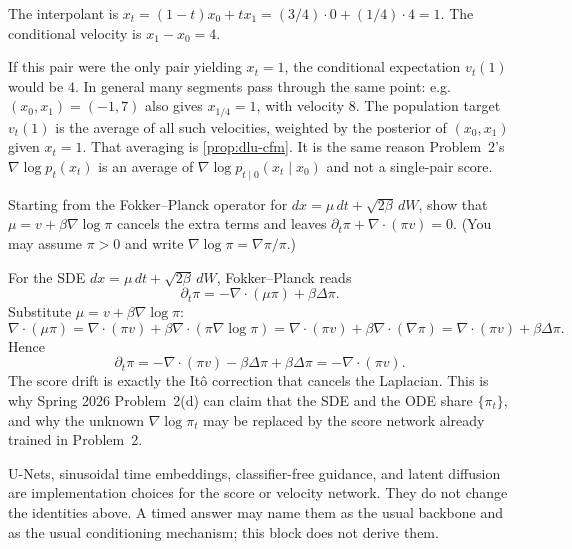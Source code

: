 \begin{solution}
The interpolant is \(x_t=(1-t)x_0+tx_1=(3/4)\cdot 0+(1/4)\cdot 4=1\). The conditional velocity is \(x_1-x_0=4\).

If this pair were the only pair yielding \(x_t=1\), the conditional expectation \(v_t(1)\) would be \(4\). In general many segments pass through the same point: e.g.\ \((x_0,x_1)=(-1,7)\) also gives \(x_{1/4}=1\), with velocity \(8\). The population target \(v_t(1)\) is the average of all such velocities, weighted by the posterior of \((x_0,x_1)\) given \(x_t=1\). That averaging is \cref{prop:dlu-cfm}. It is the same reason Problem~2's \(\nabla\log p_t(x_t)\) is an average of \(\nabla\log p_{t\mid 0}(x_t\mid x_0)\) and not a single-pair score.
\end{solution}

\begin{exercise}
\label{ex:dlu-fp}
Starting from the Fokker--Planck operator for \(dx=\mu\,dt+\sqrt{2\beta}\,dW\), show that \(\mu=v+\beta\nabla\log\pi\) cancels the extra terms and leaves \(\partial_t\pi+\nabla\cdot(\pi v)=0\). (You may assume \(\pi>0\) and write \(\nabla\log\pi=\nabla\pi/\pi\).)
\end{exercise}

\begin{solution}
For the SDE \(dx=\mu\,dt+\sqrt{2\beta}\,dW\), Fokker--Planck reads
\[
\partial_t\pi
=
-\nabla\cdot(\mu\pi)
+
\beta\Delta\pi.
\]
Substitute \(\mu=v+\beta\nabla\log\pi\):
\[
\nabla\cdot(\mu\pi)
=
\nabla\cdot(\pi v)
+
\beta\nabla\cdot(\pi\nabla\log\pi)
=
\nabla\cdot(\pi v)
+
\beta\nabla\cdot(\nabla\pi)
=
\nabla\cdot(\pi v)
+
\beta\Delta\pi.
\]
Hence
\[
\partial_t\pi
=
-\nabla\cdot(\pi v)-\beta\Delta\pi+\beta\Delta\pi
=
-\nabla\cdot(\pi v).
\]
The score drift is exactly the It\^o correction that cancels the Laplacian. This is why Spring 2026 Problem~2(d) can claim that the SDE and the ODE share \(\{\pi_t\}\), and why the unknown \(\nabla\log\pi_t\) may be replaced by the score network already trained in Problem~2.
\end{solution}

\begin{remark}
\label{rem:dlu-eng-gaps}
U-Nets, sinusoidal time embeddings, classifier-free guidance, and latent diffusion are implementation choices for the score or velocity network. They do not change the identities above. A timed answer may name them as the usual backbone and as the usual conditioning mechanism; this block does not derive them.
\end{remark}


